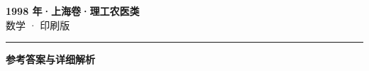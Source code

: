 \documentclass[zihao=5, a4paper]{ctexart}
\begin{document}
\begin{center}
  {\Large\bfseries 1998 年·上海卷·理工农医类}\\[4pt]
  {\large 数学 · 印刷版}
\end{center}
\medskip
{}

\par\bigskip\hrule\bigskip
{}
\begin{center}{\large\bfseries 参考答案与详细解析}\end{center}
\smallskip

\end{document}
